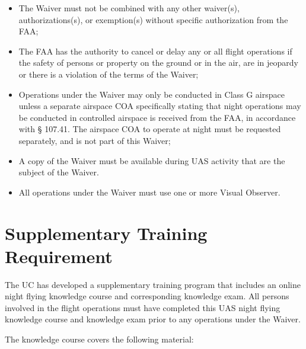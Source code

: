 \documentclass[
]{book}
\providecommand{\tightlist}{%
  \setlength{\itemsep}{0pt}\setlength{\parskip}{0pt}}
\begin{document}
\begin{itemize}
\tightlist
\item
  The Waiver must not be combined with any other waiver(s), authorizations(s), or exemption(s) without specific authorization from the FAA;
\item
  The FAA has the authority to cancel or delay any or all flight operations if the safety of persons or property on the ground or in the air, are in jeopardy or there is a violation of the terms of the Waiver;
\item
  Operations under the Waiver may only be conducted in Class G airspace unless a separate airspace COA specifically stating that night operations may be conducted in controlled airspace is received from the FAA, in accordance with § 107.41. The airspace COA to operate at night must be requested separately, and is not part of this Waiver;
\item
  A copy of the Waiver must be available during UAS activity that are the subject of the Waiver.
\item
  All operations under the Waiver must use one or more Visual Observer.
\end{itemize}

\hypertarget{s29-tr}{%
\section{Supplementary Training Requirement}\label{s29-tr}}

The UC has developed a supplementary training program that includes an online night flying knowledge course and corresponding knowledge exam. All persons involved in the flight operations must have completed this UAS night flying knowledge course and knowledge exam prior to any operations under the Waiver.

The knowledge course covers the following material:
\end{document}

